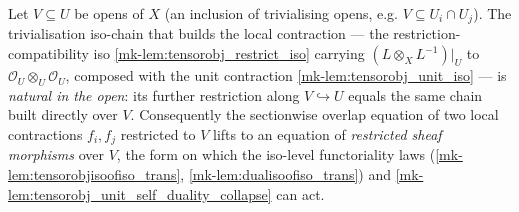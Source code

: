 \begin{lemma}\label{mk-lem:trivialisation_restrict_compat}
  \leanok

  Let \(V \subseteq U\) be opens of \(X\) (an inclusion of trivialising opens, e.g.
  \(V \subseteq U_i \cap U_j\)). The trivialisation iso-chain that builds the local
  contraction --- the restriction-compatibility iso \ref{mk-lem:tensorobj_restrict_iso}
  carrying \((L \otimes_X L^{-1})|_U\) to \(\mathcal{O}_U \otimes_U \mathcal{O}_U\),
  composed with the unit contraction \ref{mk-lem:tensorobj_unit_iso} --- is \emph{natural in
  the open}: its further restriction along \(V \hookrightarrow U\) equals the same chain
  built directly over \(V\). Consequently the sectionwise overlap equation of two local
  contractions \(f_i, f_j\) restricted to \(V\) lifts to an equation of \emph{restricted
  sheaf morphisms} over \(V\), the form on which the iso-level functoriality laws
  (\ref{mk-lem:tensorobjisoofiso_trans}, \ref{mk-lem:dualisoofiso_trans}) and
  \ref{mk-lem:tensorobj_unit_self_duality_collapse} can act.
\end{lemma}
